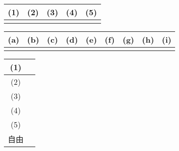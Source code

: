 

\begin{table}[htb]
    \begin{center} 
      \begin{tabular}{|p{}|p{}|p{}|p{}|p{}|} \hline
        (1) & (2) & (3) & (4) & (5)\\ \hline \hline
          &  & & &  \\ \hline		
      \end{tabular}
    \end{center}
  \end{table}

  \begin{table}[htb]
    \begin{center} 
      \begin{tabular}{|p{}|p{}|p{}|p{}|p{}|p{}|p{}|p{}|p{}|} \hline
        (a) & (b) & (c) & (d) & (e) & (f) & (g) & (h) & (i)\\ \hline
          &  & & & & & & &  \\ \hline		
      \end{tabular}
    \end{center}
  \end{table}

    \begin{table}[htb]
    \renewcommand\arraystretch{3.0}
    \begin{center} 
      \begin{tabular}{|c|p{}|} \hline
        (1) & \\ \hline
        (2)  & \\ \hline
        (3) & \\ \hline
        (4)  & \\ \hline
        (5) & \\ \hline
        自由  & \\ \hline
      \end{tabular}
    \end{center}
  \end{table}

